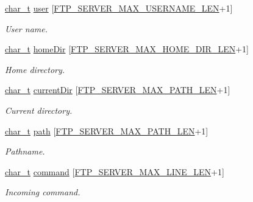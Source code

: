 \begin{DoxyCompactItemize}
\hyperlink{compiler__port_8h_a40bb5262bf908c328fbcfbe5d29d0201}{char\+\_\+t} \hyperlink{struct__FtpClientConnection_a6dbbd01eeb99077fe4441cd64620c696}{user} \mbox{[}\hyperlink{ftp__server_8h_a214093e595eff13cf5dde31875678cb4}{F\+T\+P\+\_\+\+S\+E\+R\+V\+E\+R\+\_\+\+M\+A\+X\+\_\+\+U\+S\+E\+R\+N\+A\+M\+E\+\_\+\+L\+EN}+1\mbox{]}
\begin{DoxyCompactList}\small\item\em User name. \end{DoxyCompactList}\item 
\hyperlink{compiler__port_8h_a40bb5262bf908c328fbcfbe5d29d0201}{char\+\_\+t} \hyperlink{struct__FtpClientConnection_a44b57789dfb498b410657e91c61e50bb}{home\+Dir} \mbox{[}\hyperlink{ftp__server_8h_a35155939971b184ab508d61e3373d997}{F\+T\+P\+\_\+\+S\+E\+R\+V\+E\+R\+\_\+\+M\+A\+X\+\_\+\+H\+O\+M\+E\+\_\+\+D\+I\+R\+\_\+\+L\+EN}+1\mbox{]}
\begin{DoxyCompactList}\small\item\em Home directory. \end{DoxyCompactList}\item 
\hyperlink{compiler__port_8h_a40bb5262bf908c328fbcfbe5d29d0201}{char\+\_\+t} \hyperlink{struct__FtpClientConnection_a82f458263d012950c964b88d899637c6}{current\+Dir} \mbox{[}\hyperlink{ftp__server_8h_ade570d175c68d8272bc482bf337af10f}{F\+T\+P\+\_\+\+S\+E\+R\+V\+E\+R\+\_\+\+M\+A\+X\+\_\+\+P\+A\+T\+H\+\_\+\+L\+EN}+1\mbox{]}
\begin{DoxyCompactList}\small\item\em Current directory. \end{DoxyCompactList}\item 
\hyperlink{compiler__port_8h_a40bb5262bf908c328fbcfbe5d29d0201}{char\+\_\+t} \hyperlink{struct__FtpClientConnection_a2361233b4c33bcc14ac17f6b4029054f}{path} \mbox{[}\hyperlink{ftp__server_8h_ade570d175c68d8272bc482bf337af10f}{F\+T\+P\+\_\+\+S\+E\+R\+V\+E\+R\+\_\+\+M\+A\+X\+\_\+\+P\+A\+T\+H\+\_\+\+L\+EN}+1\mbox{]}
\begin{DoxyCompactList}\small\item\em Pathname. \end{DoxyCompactList}\item 
\hyperlink{compiler__port_8h_a40bb5262bf908c328fbcfbe5d29d0201}{char\+\_\+t} \hyperlink{struct__FtpClientConnection_a489a295a889fadad7cc8e44d01111372}{command} \mbox{[}\hyperlink{ftp__server_8h_a311e12601252dc2319ee256bb6e714ba}{F\+T\+P\+\_\+\+S\+E\+R\+V\+E\+R\+\_\+\+M\+A\+X\+\_\+\+L\+I\+N\+E\+\_\+\+L\+EN}+1\mbox{]}
\begin{DoxyCompactList}\small\item\em Incoming command. \end{DoxyCompactList}\item 

\end{DoxyCompactItemize}
